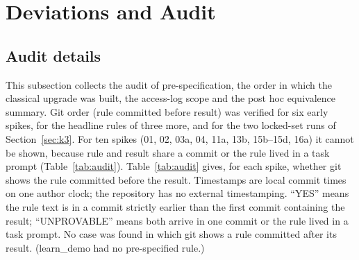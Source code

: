 \small

\section{Deviations and Audit}
\label{app:audit}

\subsection*{Audit details}
This subsection collects the audit of pre-specification, the order in which the classical upgrade was built, the access-log scope and the post hoc equivalence summary. Git order (rule committed before result) was verified for six early spikes, for the headline rules of three more, and for the two locked-set runs of Section~\ref{sec:k3}. For ten spikes (01, 02, 03a, 04, 11a, 13b, 15b--15d, 16a) it cannot be shown, because rule and result share a commit or the rule lived in a task prompt (Table~\ref{tab:audit}). Table~\ref{tab:audit} gives, for each spike, whether git shows the rule committed before the result. Timestamps are local commit times on one author clock; the repository has no external timestamping. ``YES'' means the rule text is in a commit strictly earlier than the first commit containing the result; ``UNPROVABLE'' means both arrive in one commit or the rule lived in a task prompt. No case was found in which git shows a rule committed after its result. (learn\_demo had no pre-specified rule.)

